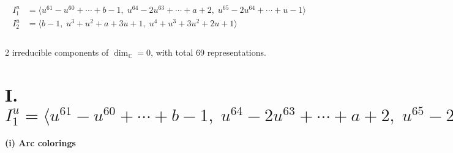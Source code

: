 \documentclass[1p]{elsarticle_modified}
\theoremstyle{definition}
\begin{document}
\begin{align*}
I^u_{1}&=\langle 
u^{61}- u^{60}+\cdots+b-1,\;u^{64}-2 u^{63}+\cdots+a+2,\;u^{65}-2 u^{64}+\cdots+u-1\rangle \\
I^u_{2}&=\langle 
b-1,\;u^3+u^2+a+3 u+1,\;u^4+u^3+3 u^2+2 u+1\rangle \\
\\
\end{align*}
\raggedright * 2 irreducible components of $\dim_{\mathbb{C}}=0$, with total 69 representations.\\
\newpage
\renewcommand{\arraystretch}{1}
\centering \section*{I. $I^u_{1}= \langle u^{61}- u^{60}+\cdots+b-1,\;u^{64}-2 u^{63}+\cdots+a+2,\;u^{65}-2 u^{64}+\cdots+u-1 \rangle$}
\flushleft \textbf{(i) Arc colorings}\\
\end{document}
